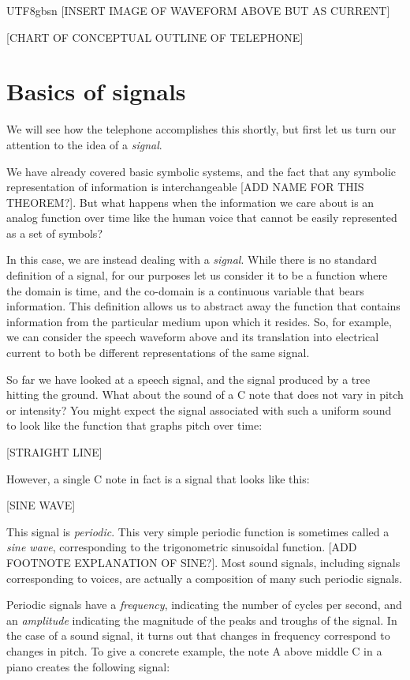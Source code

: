 \documentclass[UTF8]{book}
\begin{document}
\begin{CJK}{UTF8}{gbsn}
[INSERT IMAGE OF WAVEFORM ABOVE BUT AS CURRENT]

[CHART OF CONCEPTUAL OUTLINE OF TELEPHONE]

\section{Basics of signals}

We will see how the telephone accomplishes this shortly, but first let us turn our attention to the idea of a \emph{signal}.

We have already covered basic symbolic systems, and the fact that any symbolic representation of information is interchangeable [ADD NAME FOR THIS THEOREM?]. But what happens when the information we care about is an analog function over time like the human voice that cannot be easily represented as a set of symbols?

In this case, we are instead dealing with a \emph{signal}. While there is no standard definition of a signal, for our purposes let us consider it to be a function where the domain is time, and the co-domain is a continuous variable that bears information. This definition allows us to abstract away the function that contains information from the particular medium upon which it resides. So, for example, we can consider the speech waveform above and its translation into electrical current to both be different representations of the same signal.

So far we have looked at a speech signal, and the signal produced by a tree hitting the ground. What about the sound of a C note that does not vary in pitch or intensity? You might expect the signal associated with such a uniform sound to look like the function that graphs pitch over time:

[STRAIGHT LINE]

However, a single C note in fact is a signal that looks like this:

[SINE WAVE]

This signal is \emph{periodic}. This very simple periodic function is sometimes called a \emph{sine wave}, corresponding to the trigonometric sinusoidal function. [ADD FOOTNOTE EXPLANATION OF SINE?]. Most sound signals, including signals corresponding to voices, are actually a composition of many such periodic signals.

Periodic signals have a \emph{frequency}, indicating the number of cycles per second, and an \emph{amplitude} indicating the magnitude of the peaks and troughs of the signal. In the case of a sound signal, it turns out that changes in frequency correspond to changes in pitch. To give a concrete example, the note A above middle C in a piano creates the following signal:


\end{CJK}
\end{document}
